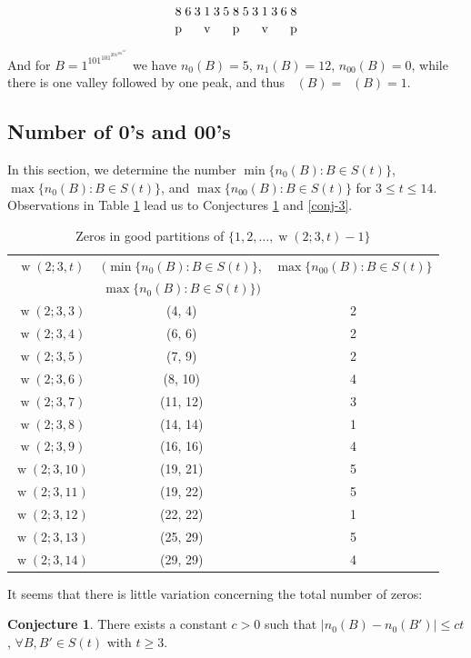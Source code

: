 \documentclass[final,3p,times]{elsarticle}
\theoremstyle{definition}
\newtheorem{conj}{Conjecture}[section]
\newcommand{\set}[1]{\{#1\}}
\renewcommand{\leq}{\le} %
\providecommand{\abs}[1]{\lvert #1 \rvert}
\DeclareMathOperator{\np}{\mathit{n}_p}
\DeclareMathOperator{\nv}{\mathit{n}_v}
\DeclareMathOperator{\vdw}{w}
\begin{document}
$${8 \atop{\textrm p}} {6 \atop } {3 \atop } {1 \atop {\textrm v}} {3 \atop } {5 \atop }
{8 \atop {\textrm p}} {5 \atop } {3 \atop } {1 \atop {\textrm v}} {3 \atop } {6 \atop } {8 \atop {\textrm p}}$$

And for $B = 1^101^101^201^201^301^3$ we have $n_0(B) = 5$, $n_1(B) = 12$, $n_{00}(B) = 0$, while
there is one valley followed by one peak, and thus $\nv(B) = \np(B) = 1$.



\subsection{Number of 0's and 00's}
\label{sec:mum0}

In this section, we determine the number $\min\set{n_0(B): B\in S(t)}$,
$\max\set{n_0(B): B\in S(t)}$, and $\max\set{n_{00}(B):B\in S(t)}$ for $3\leq t\leq 14$.
Observations in Table \ref{tab-zeros} lead us to Conjectures
\ref{conj-2} and \ref{conj-3}.

\begin{longtable}[c]{|c|c|c|}
\caption{Zeros in good partitions of $\set{1,2,\dots,\vdw(2; 3, t)-1}$}
\label{tab-zeros}\\
  \hline \hline
  $\vdw(2; 3, t)$ & $(\min\set{n_0(B): B\in S(t)}$, & $\max\set{n_{00}(B): B\in S(t)}$\\
 {} & $\max\set{n_0(B): B\in S(t)})$ & {} \\
  \hline
{$\vdw(2; 3, 3)$} & {(4, 4)} & {2}\\
{$\vdw(2; 3, 4)$} & {(6, 6)} & {2}\\
{$\vdw(2; 3, 5)$} & {(7, 9)} & {2}\\
{$\vdw(2; 3, 6)$} & {(8, 10)} & {4}\\
{$\vdw(2; 3, 7)$} & {(11, 12)} & {3}\\
{$\vdw(2; 3, 8)$} & {(14, 14)} & {1}\\
{$\vdw(2; 3, 9)$} & {(16, 16)} & {4}\\
{$\vdw(2; 3, 10)$} & {(19, 21)} & {5}\\
{$\vdw(2; 3, 11)$} & {(19, 22)} & {5}\\
{$\vdw(2; 3, 12)$} & {(22, 22)} & {1}\\
{$\vdw(2; 3, 13)$} & {(25, 29)} & {5}\\
{$\vdw(2; 3, 14)$} & {(29, 29)} & {4}\\
\hline
\end{longtable}

It seems that there is little variation concerning the total number of zeros:
\begin{conj}\label{conj-2}
There exists a constant $c > 0$ such that
$\abs{n_0(B)-n_0(B')} \leq ct$, $\forall{B,B'}\in S(t)$  with $t\geq 3$.
\end{conj}
\end{document}
